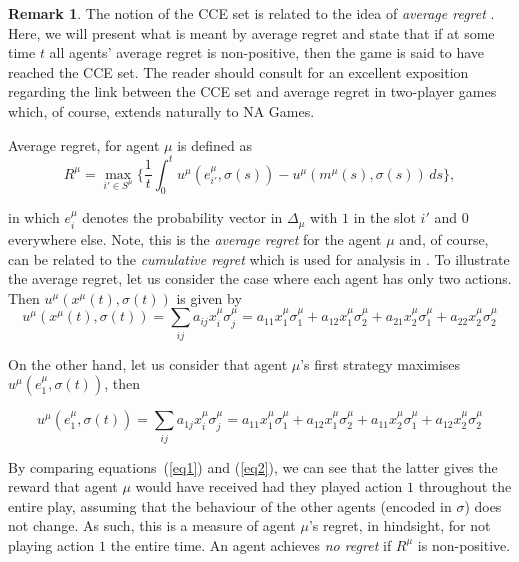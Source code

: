\documentclass{article}
\theoremstyle{definition}
\newtheorem*{remark}{Remark}
\newcommand{\pure}[2]{e^{#1}_{#2}}
\begin{document}
  \begin{remark} \label{rem::regretvsCCE}
    The notion of the CCE set is related to the idea of \emph{average regret}  \cite{Nisan2007}. Here, we
    will present what is meant by average regret and state that if at some time $t$ all agents'
    average regret is non-positive, then the game is said to have reached the CCE set. The
    reader should consult \cite{Ostrovski2014} for an excellent exposition regarding the
    link between the CCE set and average regret in two-player games which, of course, extends
    naturally to NA Games.
    
    Average regret, for agent $\mu$ is defined as
%
    \begin{equation*}
      R^{\mu} = \max_{i' \in S^\mu} \Big\{ \frac{1}{t} \int_{0}^{t} u^{\mu}(\pure{\mu}{i'}, \sigma(s)) - u^{\mu}(m^\mu(s), \sigma(s)) \, ds \Big\},
    \end{equation*}
  
    in which $\pure{\mu}{i}$ denotes the probability vector in $\Delta_\mu$ with $1$ in the slot
    $i'$ and $0$ everywhere else. Note, this is the \emph{average regret} for the agent $\mu$
    and, of course, can be related to the \emph{cumulative regret} which is used for analysis
    in \cite{Cesa-Bianchi2021}.  To illustrate the average regret, let us
    consider the case where each agent has only two actions. Then $u^{\mu}(x^\mu(t), \sigma(t))$
    is given by
%    
    \begin{equation} \label{eq1}
      u^{\mu}(x^\mu(t), \sigma(t)) = \sum_{ij} a_{ij} x_i^\mu \sigma_j^\mu = a_{11} x_1^\mu \sigma_1^\mu + a_{12} x_1^\mu \sigma_2^\mu + a_{21} x_2^\mu \sigma_1^\mu + a_{22} x_2^\mu \sigma_2^\mu
    \end{equation}
  
    On the other hand, let us consider that agent $\mu$'s first strategy maximises $u^{\mu}(\pure{\mu}{1}, \sigma(t))$, then
  
    \begin{equation}  \label{eq2}
      u^{\mu}(\pure{\mu}{1}, \sigma(t)) = \sum_{ij} a_{1j} x_i^\mu \sigma_j^\mu = a_{11} x_1^\mu \sigma_1^\mu + a_{12} x_1^\mu \sigma_2^\mu + a_{11} x_2^\mu \sigma_1^\mu + a_{12} x_2^\mu \sigma_2^\mu 
    \end{equation}
  
    By comparing equations~(\ref{eq1}) and (\ref{eq2}),
    we can see that the latter gives the reward that agent $\mu$ would have received had they played action $1$ throughout the entire play, assuming that the behaviour of the other agents (encoded in $\sigma$) does not change. As such, this is a measure of agent $\mu$'s regret, in hindsight, for not playing action $1$ the entire time. An agent achieves \emph{no regret} if $R^\mu$ is non-positive.
  \end{remark}
\end{document}
